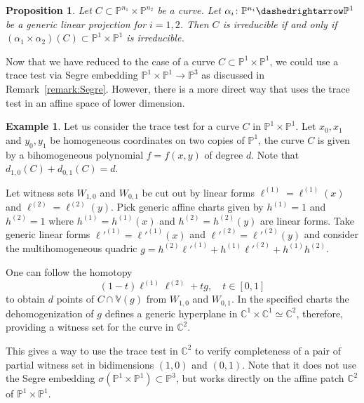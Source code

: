 \documentclass[12pt]{amsart}
\newtheorem{proposition}[theorem]{Proposition}
\theoremstyle{definition}
\newtheorem{example}[theorem]{Example}
\begin{document}
\begin{proposition}\label{prop:generic-projection-to-P1xP1}
Let $C\subset {{\mathbb{P}}}^{n_1}\times{{\mathbb{P}}}^{n_2}$ be a curve.
Let $\alpha_i\colon{{\mathbb{P}}}^{n_i}{\dashedrightarrow} {{\mathbb{P}}}^1$ be a generic linear projection for $i=1,2$.
Then $C$ is irreducible if and only if $(\alpha_1\times\alpha_2)(C) \subset {{\mathbb{P}}}^1\times{{\mathbb{P}}}^1$ is irreducible.
\end{proposition}

Now that we have reduced to the case of a curve $C \subset {{\mathbb{P}}}^1\times{{\mathbb{P}}}^1$, we could
use a trace test via Segre embedding ${{\mathbb{P}}}^1\times{{\mathbb{P}}}^1\to {{\mathbb{P}}}^3$ as discussed in Remark~\ref{remark:Segre}.
However, there is a more direct way that uses the trace test in an affine space of lower dimension.

\begin{example}\label{Ex:P1xP1}
Let us consider the trace test for a curve $C$ in ${{\mathbb{P}}}^1\times{{\mathbb{P}}}^1$.
Let $x_0,x_1$ and $y_0,y_1$ be homogeneous coordinates on two copies of ${{\mathbb{P}}}^1$,
the curve $C$ is given by a bihomogeneous polynomial $f=f(x,y)$ of degree $d$.
Note that $d_{1,0}(C)+d_{0,1}(C) = d$.

Let witness sets  $W_{1,0}$ and $W_{0,1}$ be cut out by linear forms $\ell^{(1)}=\ell^{(1)}(x)$ and $\ell^{(2)}=\ell^{(2)}(y)$.
Pick generic affine charts given by $h^{(1)}=1$ and $h^{(2)}=1$ where $h^{(1)}=h^{(1)}(x)$ and $h^{(2)}=h^{(2)}(y)$ are linear forms.
Take generic  linear forms $\ell'^{(1)}=\ell'^{(1)}(x)$ and $\ell'^{(2)}=\ell'^{(2)}(y)$ and consider the multihomogeneous quadric $g = h^{(2)}\ell'^{(1)} + h^{(1)}\ell'^{(2)} + h^{(1)}h^{(2)}$.

One can follow the homotopy $$(1-t)\ell^{(1)}\ell^{(2)} + tg,\quad t\in[0,1]$$ to obtain $d$ points of $C\cap{{\mathbb{V} \! \left({g}\right)}}$ from $W_{1,0}$ and $W_{0,1}$.
In the specified charts the dehomogenization of $g$ defines a generic hyperplane in ${{\mathbb{C}}}^1\times{{\mathbb{C}}}^1 \simeq {{\mathbb{C}}}^2$, therefore, providing a witness set for the curve in ${{\mathbb{C}}}^2$.

This gives a way to use the trace test in ${{\mathbb{C}}}^2$ to verify completeness of a pair of partial witness set in
bidimensions $(1,0)$ and $(0,1)$.
Note that it does not use the Segre embedding $\sigma({{\mathbb{P}}}^1\times{{\mathbb{P}}}^1)\subset{{\mathbb{P}}}^3$, but works directly on
the affine patch ${{\mathbb{C}}}^2$ of ${{\mathbb{P}}}^1\times{{\mathbb{P}}}^1$.
\end{example}
\end{document}
